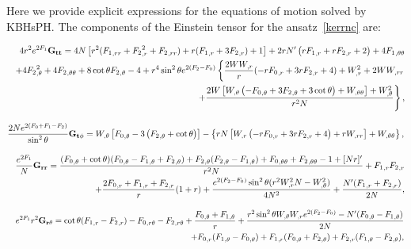 Here we provide explicit expressions for the equations of motion solved by KBHsPH. The components of the Einstein tensor for the ansatz~\eqref{kerrnc} are:



\begin{eqnarray}
&&  4r^2  e^{2F_1}{\bf G_{tt}}= 4 
N \left[r^2 ({F_1}_{,rr}+ {F_2}_{,r}^2+
{F_2}_{,rr})
+r( 
{F_1}_{,r}+3  {F_2}_{,r})+1\right] + 2 r N'  \left(r 
{F_1}_{,r}+r {F_2}_{,r}+2\right)+4 {F_1}_{,\theta\theta}\nonumber \\
%
&& +4  
{F_2}_{,\theta}^2+4  {F_2}_{,\theta\theta}
%
+8
\cot \theta {F_2}_{,\theta}-4 
%
 +r^4 \sin ^2\theta e^{2 ({F_2}-F_0)} 
 \left\{
 \frac{2W W_{,r}}{r}(- r {F_0}_{,r} +3r{F_2}_{,r}+4 )
 +W_{,r}^2+2W W_{,rr} 
 \right. \nonumber \\ 
%
&& \left. + \frac{2 W \left[W_{,\theta} \left(- 
{F_0}_{,\theta}+3 {F_2}_{,\theta}+3 \cot\theta\right)+ W_{,\theta\theta}\right]+ W_{,\theta}^2}{r^2N} \right\},
\end{eqnarray}

\begin{equation}
\frac{2Ne^{2(F_0+F_1-F_2)}}{\sin^2\theta}{\bf G_{t\phi }}=   W_{,\theta} \left[ {F_0}_{,\theta}-3 \left( 
{F_2}_{,\theta}+\cot\theta\right)\right]- \left\{r N 
\left[W_{,r} \left(-r {F_0}_{,r}+3 r 
{F_2}_{,r}+4\right)+r 
W_{,rr}\right]+W_{,\theta\theta}\right\}  ,
\end{equation}



\begin{eqnarray}
&&  \frac{e^{2F_1}}{N}{\bf G_{rr}}= \frac{({F_0}_{,\theta}+\cot\theta)({F_0}_{,\theta}-{F_1}_{,\theta}+
{F_2}_{,\theta})+{F_2}_{,\theta}({F_2}_{,\theta}-{F_1}_{,\theta})
+{F_0}_{,\theta\theta}+{F_2}_{,\theta\theta}-1+[Nr]'}{r^2 N}+{F_1}_{,r} {F_2}_{,r}\nonumber \\
&& 
%
+\frac{2{F_0}_{,r}+{F_1}_{,r}+{F_2}_{,r}}{r}(1+r)+\frac{e^{2(
{F_2}- {F_0})} \sin ^2\theta (r^2W_{,r}^2N-W_{,\theta}^2 ) }{4 N^2} 
%
+\frac{N'( 
{F_1}_{,r}+{F_2}_{,r})}{2N},
\end{eqnarray}


\begin{eqnarray}
 && e^{2F_1}r^2{\bf G_{r\theta}}=
\cot\theta (
{F_1}_{,r} -{F_2}_{,r} )-{F_0}_{,r\theta}-{F_2}_{,r\theta}+\frac{{F_0}_{,\theta}+{F_1}_{,\theta}}{r}+\frac{r^2 \sin ^2\theta 
W_{,\theta} W_{,r} e^{2( {F_2}- {F_0})}-N'( {F_0}_{,\theta}-{F_1}_{,\theta})}{2 
N} \nonumber \\ 
&& + {F_0}_{,r} ({F_1}_{,\theta}-{F_0}_{,\theta})+
{F_1}_{,r}({F_0}_{,\theta}+{F_2}_{,\theta} )+{F_2}_{,r}( {F_1}_{,\theta}- {F_2}_{,\theta} ),
\end{eqnarray}




